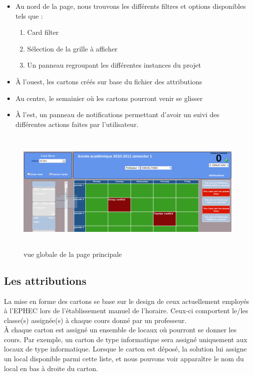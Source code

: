 \begin{itemize}	
	
	\item Au nord de la page, nous trouvons les différents filtres et options disponibles tels que :
	\begin{enumerate}
		\item Card filter
		\item Sélection de la grille à afficher
		\item Un panneau regroupant les différentes instances du projet\\
	\end{enumerate}
	\item À l'ouest, les cartons créés sur base du fichier des attributions\\
	\item Au centre, le semainier où les cartons pourront venir se glisser\\
	\item À l'est, un panneau de notifications permettant d'avoir un suivi des différentes actions faites par l'utilisateur.
\end{itemize}

\begin{figure}[!h]
	\begin{center}
	\includegraphics[width=16cm,height=6cm]{littlemain.png}	
	\caption{vue globale de la page principale}
\end{center}
\end{figure}

\subsection{Les attributions}
La mise en forme des cartons se base sur le design de ceux actuellement employés à l'EPHEC lors de l'établissement manuel de l'horaire. Ceux-ci comportent le/les classe(s) assignée(s) à chaque cours donné par un professeur.\\
\newline
\indent
À chaque carton est assigné un ensemble de locaux où pourront se donner les cours. Par exemple, un carton de type informatique sera assigné uniquement aux locaux de type informatique. Lorsque le carton est déposé, la solution lui assigne un local disponible parmi cette liste, et nous pouvons voir apparaître le nom du local en bas à droite du carton.

